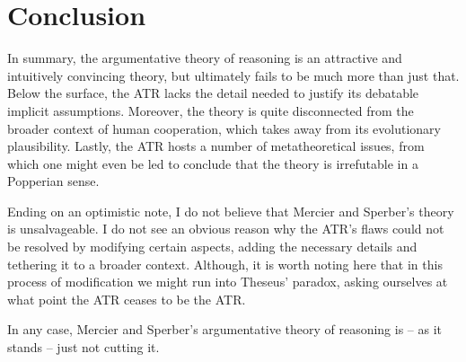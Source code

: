 \section{Conclusion}
\label{sec:scrutiny-conclusion}

In summary, the argumentative theory of reasoning is an attractive and intuitively convincing theory, but ultimately fails to be much more than just that. Below the surface, the ATR lacks the detail needed to justify its debatable implicit assumptions. Moreover, the theory is quite disconnected from the broader context of human cooperation, which takes away from its evolutionary plausibility. Lastly, the ATR hosts a number of metatheoretical issues, from which one might even be led to conclude that the theory is irrefutable in a Popperian sense.

Ending on an optimistic note, I do not believe that Mercier and Sperber's theory is unsalvageable. I do not see an obvious reason why the ATR's flaws could not be resolved by modifying certain aspects, adding the necessary details and tethering it to a broader context. Although, it is worth noting here that in this process of modification we might run into Theseus' paradox, asking ourselves at what point the ATR ceases to be the ATR.

In any case, Mercier and Sperber's argumentative theory of reasoning is -- as it stands -- just not cutting it.

